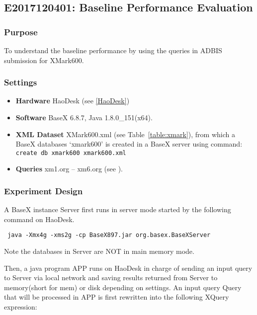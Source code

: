 \subsection{E2017120401: Baseline Performance Evaluation}
 
\subsubsection{Purpose}
To understand the baseline performance by using
the queries in ADBIS submission for XMark600.
 
\subsubsection{Settings} 

\begin{itemize}

\item \textbf{Hardware} HaoDesk (see \ref{HaoDesk})\\
\item \textbf{Software} BaseX 6.8.7, Java 1.8.0\_151(x64).\\
\item \textbf{XML Dataset} XMark600.xml (see Table~\ref{table:xmark}), 
from which a BaseX databases `xmark600' is created in a BaseX server using command:\\
\verb|create db xmark600 xmark600.xml|
\item \textbf{Queries} xm1.org -- xm6.org (see ).

\end{itemize}


\subsubsection{Experiment Design}  

A BaseX instance Server first runs in server mode started by the following
command on HaoDesk.

\verb| java -Xmx4g -xms2g -cp BaseX897.jar org.basex.BaseXServer|

Note the databases in Server are NOT in main memory mode.

Then, a java program APP runs on HaoDesk in charge of sending an input query to
Server via local network and saving results returned from Server to memory(short
for mem) or disk depending on settings. An input query Query that will be
processed in APP is first rewritten into the following XQuery expression:

